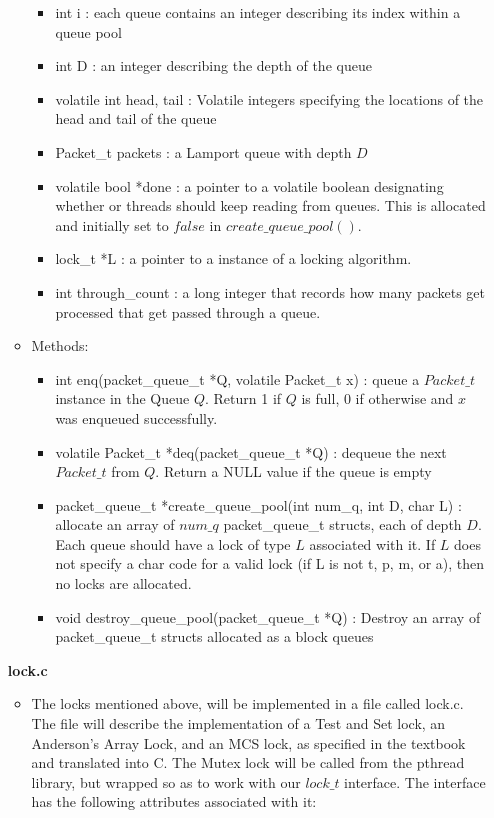 \documentclass[]{article}
\begin{document}
\begin{itemize}
\begin{itemize}
		\begin{itemize}
			\item int i : each queue contains an integer describing its index within a queue pool
			\item int D : an integer describing the depth of the queue
			\item volatile int head, tail : Volatile integers specifying the locations of the head and tail of the queue
			\item Packet\_t packets : a Lamport queue with depth $D$
			\item volatile bool *done : a pointer to a volatile boolean designating whether or threads should keep reading from queues. This is allocated and initially set to $false$ in $create\_queue\_pool()$.
			\item lock\_t *L : a pointer to a instance of a locking algorithm.
			\item int  through\_count : a long integer that records how many packets get processed that get passed through a queue.
		\end{itemize}
		\item Methods:
		\begin{itemize}
			\item int enq(packet\_queue\_t *Q, volatile Packet\_t x) : queue a $Packet\_t$ instance in the Queue $Q$. Return 1 if $Q$ is full, 0 if otherwise and $x$ was enqueued successfully.
			\item volatile Packet\_t *deq(packet\_queue\_t *Q) : dequeue the next $Packet\_t$ from $Q$. Return a NULL value if the queue is empty
			\item packet\_queue\_t *create\_queue\_pool(int num\_q, int D, char L) : allocate an array of $num\_q$ packet\_queue\_t structs, each of depth $D$. Each queue should have a lock of type $L$ associated with it. If $L$ does not specify a char code for a valid lock (if L is not t, p, m, or a), then no locks are allocated.
			\item void destroy\_queue\_pool(packet\_queue\_t *Q) : Destroy an array of packet\_queue\_t structs allocated as a block queues
		\end{itemize}
	\end{itemize}
	\textbf{lock.c}
	\begin{itemize}
		\item The locks mentioned above, will be implemented in a file called lock.c. The file will describe the implementation of a Test and Set lock, an Anderson's Array Lock, and an MCS lock, as specified in the textbook and translated into C. The Mutex lock will be called from the pthread library, but wrapped so as to work with our $lock\_t$ interface. The interface has the following attributes associated with it:

\end{itemize}
\end{itemize}
\end{document}
